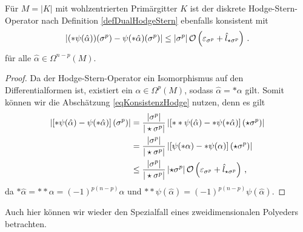   \begin{folgerung}
    Für \( M=|K| \) mit wohlzentrierten Primärgitter \( K \) ist der diskrete Hodge-Stern-Operator nach Definition \ref{defDualHodgeStern} ebenfalls konsistent mit
    \begin{align}
      \label{eqKonsistenzDualHodge}
      \left| (*\psi(\hat\alpha))(\sigma^{p}) - \psi(*\hat\alpha)(\sigma^{p})\right| \le \left| \sigma^{p} \right| \mathcal{O}\left(\varepsilon_{\sigma^{p}} + \hat{l}_{\star\sigma^{p}}\right) \,\text{.}
    \end{align}
    für alle \( \hat\alpha\in\Omega^{n-p}(M) \).
  \end{folgerung}
  \begin{proof}
    Da der Hodge-Stern-Operator ein Isomorphismus auf den Differentialformen ist, existiert ein \( \alpha\in\Omega^{p}(M) \), sodass \( \hat\alpha = *\alpha \) gilt.
    Somit können wir die Abschätzung \eqref{eqKonsistenzHodge} nutzen, denn es gilt
    \begin{align}
      \left| \left[ *\psi(\hat\alpha) - \psi(*\hat\alpha) \right](\sigma^{p}) \right|
        &= \frac{|\sigma^{p}|}{|\star\sigma^{p}|} \left| \left[ **\psi(\hat\alpha) - *\psi(*\hat\alpha) \right](\star\sigma^{p}) \right| \\
        &= \frac{|\sigma^{p}|}{|\star\sigma^{p}|} \left| \left[ \psi(*\alpha) - *\psi(\alpha) \right](\star\sigma^{p}) \right|\\
        &\le  \frac{|\sigma^{p}|}{|\star\sigma^{p}|} \left| \star\sigma^{p} \right| \mathcal{O}\left(\varepsilon_{\sigma^{p}} + \hat{l}_{\star\sigma^{p}}\right) \,\text{,}
    \end{align}
    da \( *\hat\alpha = **\alpha = (-1)^{p(n-p)}\alpha \) und \( **\psi(\hat\alpha) =  (-1)^{p(n-p)}\psi(\hat\alpha)\).
  \end{proof}

  Auch hier können wir wieder den Spezialfall eines zweidimensionalen Polyeders betrachten.
  
